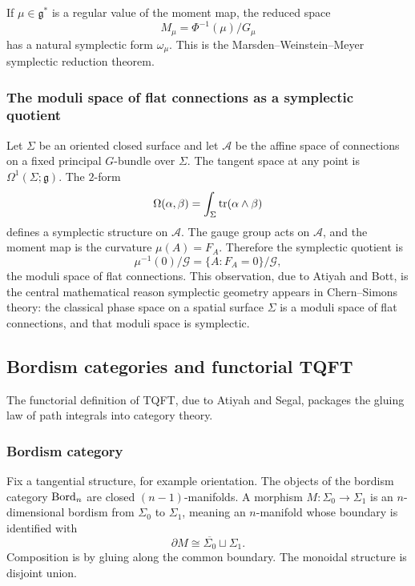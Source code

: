 If $\mu\in\mathfrak g^*$ is a regular value of the moment map, the reduced space
\begin{equation}
  M_{\mu}=\Phi^{-1}(\mu)/G_\mu
\end{equation}
has a natural symplectic form $\omega_\mu$. This is the Marsden--Weinstein--Meyer symplectic reduction theorem.

\subsubsection{The moduli space of flat connections as a symplectic quotient}

Let $\Sigma$ be an oriented closed surface and let $\mathcal{A}$ be the affine space of connections on a fixed principal $G$-bundle over $\Sigma$. The tangent space at any point is $\Omega^1(\Sigma;\mathfrak g)$. The $2$-form
\begin{equation}
  \Omega(\alpha,\beta)=\int_\Sigma \operatorname{tr}(\alpha\wedge\beta)
\end{equation}
defines a symplectic structure on $\mathcal{A}$. The gauge group acts on $\mathcal{A}$, and the moment map is the curvature $\mu(A)=F_A$. Therefore the symplectic quotient is
\begin{equation}
  \mu^{-1}(0)/\mathcal{G}
  =
  \{A : F_A=0\}/\mathcal{G},
\end{equation}
the moduli space of flat connections. This observation, due to Atiyah and Bott, is the central mathematical reason symplectic geometry appears in Chern--Simons theory: the classical phase space on a spatial surface $\Sigma$ is a moduli space of flat connections, and that moduli space is symplectic.

\subsection{Bordism categories and functorial TQFT}

The functorial definition of TQFT, due to Atiyah and Segal, packages the gluing law of path integrals into category theory.

\subsubsection{Bordism category}

Fix a tangential structure, for example orientation. The objects of the bordism category $\operatorname{Bord}_n$ are closed $(n-1)$-manifolds. A morphism $M : \Sigma_0 \to \Sigma_1$ is an $n$-dimensional bordism from $\Sigma_0$ to $\Sigma_1$, meaning an $n$-manifold whose boundary is identified with
\begin{equation}
  \partial M \cong \overline{\Sigma_0} \sqcup \Sigma_1.
\end{equation}
Composition is by gluing along the common boundary. The monoidal structure is disjoint union.

